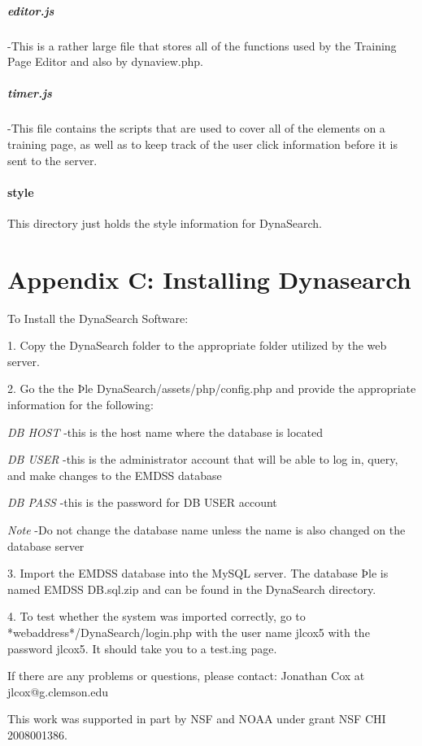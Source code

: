 \documentclass[article]{ij4uq}              %
\begin{document}
\subparagraph{editor.js} -This is a rather large file that stores all of the functions used by the Training Page Editor and also by dynaview.php.
 	
\subparagraph{timer.js} -This file contains the scripts that are used to cover all of the elements on a training page, as well as to keep track of the user click information before it is sent to the server.

\paragraph{style}
This directory just holds the style information for DynaSearch.

\section{Appendix C: Installing Dynasearch}
To Install the DynaSearch Software:

1. Copy the DynaSearch folder to the appropriate folder utilized by the web server. 

2. Go the the Þle DynaSearch/assets/php/config.php and provide the 
appropriate information for the following: 


\emph{DB HOST} -this is the host name where the database is located
	
\emph{DB USER} -this is the administrator account that will be able to log in, query, and make changes to the EMDSS database
	
\emph{DB PASS} -this is the password for DB USER account
	
\emph{Note} -Do not change the database name unless the name is also changed 
on the database server 

3. Import the EMDSS database into the MySQL server. The database Þle is named EMDSS DB.sql.zip and can be found in the DynaSearch directory. 


4. To test whether the system was imported correctly, go to *webaddress*/DynaSearch/login.php with the user name jlcox5 with the password jlcox5. It should take you to a test.ing page. 

If there are any problems or questions, please contact: 
Jonathan Cox at jlcox@g.clemson.edu 

\acknowledgements

This work was supported in part by NSF and NOAA under grant NSF CHI 2008001386.
\end{document}
